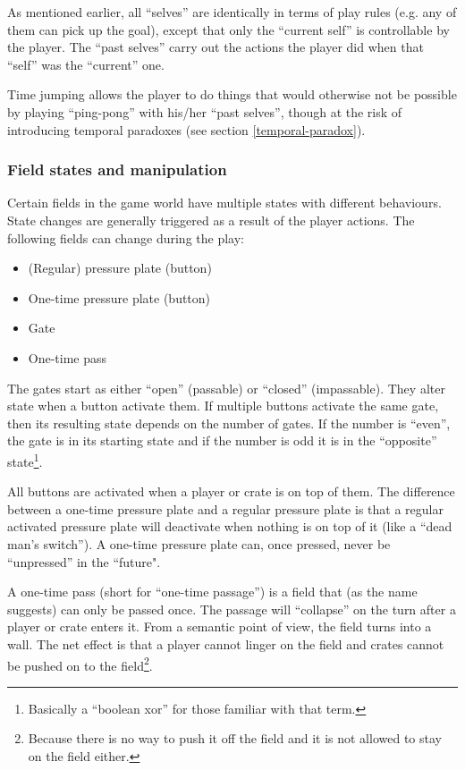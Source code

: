 As mentioned earlier, all ``selves'' are identically in terms of play
rules (e.g. any of them can pick up the goal), except that only the
``current self'' is controllable by the player.  The ``past selves''
carry out the actions the player did when that ``self'' was the
``current'' one.

Time jumping allows the player to do things that would otherwise not
be possible by playing ``ping-pong'' with his/her ``past selves'',
though at the risk of introducing temporal paradoxes (see
section \ref{temporal-paradox}).

\subsubsection{Field states and manipulation}
\label{field-states}
Certain fields in the game world have multiple states with different
behaviours.  State changes are generally triggered as a result of the
player actions.  The following fields can change during the play:

\begin{itemize}
\item (Regular) pressure plate (button)
\item One-time pressure plate (button)
\item Gate
\item One-time pass
\end{itemize}

The gates start as either ``open'' (passable) or ``closed''
(impassable).  They alter state when a button activate them.  If
multiple buttons activate the same gate, then its resulting state
depends on the number of gates.  If the number is ``even'', the
gate is in its starting state and if the number is odd it is in the
``opposite'' state\footnote{Basically a ``boolean xor'' for those
  familiar with that term.}.

All buttons are activated when a player or crate is on top of them.
The difference between a one-time pressure plate and a regular
pressure plate is that a regular activated pressure plate will
deactivate when nothing is on top of it (like a ``dead man's
switch'').  A one-time pressure plate can, once pressed, never be
``unpressed'' in the ``future".

A one-time pass (short for ``one-time passage'') is a field that
(as the name suggests) can only be passed once.  The passage will
``collapse'' on the turn after a player or crate enters it.  From a
semantic point of view, the field turns into a wall.  The net effect
is that a player cannot linger on the field and crates cannot be pushed
on to the field\footnote{Because there is no way to push it off the field
and it is not allowed to stay on the field either.}.

